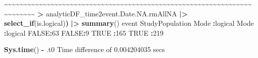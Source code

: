 \documentclass[
]{article}
\newenvironment{Shaded}{\begin{snugshade}}{\end{snugshade}}
\newcommand{\ConstantTok}[1]{\textcolor[rgb]{0.56,0.35,0.01}{#1}}
\newcommand{\DecValTok}[1]{\textcolor[rgb]{0.00,0.00,0.81}{#1}}
\newcommand{\ErrorTok}[1]{\textcolor[rgb]{0.64,0.00,0.00}{\textbf{#1}}}
\newcommand{\FloatTok}[1]{\textcolor[rgb]{0.00,0.00,0.81}{#1}}
\newcommand{\FunctionTok}[1]{\textcolor[rgb]{0.13,0.29,0.53}{\textbf{#1}}}
\newcommand{\NormalTok}[1]{#1}
\newcommand{\SpecialCharTok}[1]{\textcolor[rgb]{0.81,0.36,0.00}{\textbf{#1}}}
\begin{document}
\begin{Shaded}
\begin{Highlighting}[]
    \SpecialCharTok{\textasciitilde{}}\ErrorTok{\textasciitilde{}\textasciitilde{}\textasciitilde{}\textasciitilde{}\textasciitilde{}\textasciitilde{}\textasciitilde{}\textasciitilde{}\textasciitilde{}\textasciitilde{}\textasciitilde{}\textasciitilde{}\textasciitilde{}\textasciitilde{}\textasciitilde{}\textasciitilde{}\textasciitilde{}\textasciitilde{}\textasciitilde{}\textasciitilde{}\textasciitilde{}\textasciitilde{}\textasciitilde{}\textasciitilde{}\textasciitilde{}\textasciitilde{}\textasciitilde{}\textasciitilde{}\textasciitilde{}\textasciitilde{}\textasciitilde{}\textasciitilde{}\textasciitilde{}\textasciitilde{}\textasciitilde{}\textasciitilde{}\textasciitilde{}\textasciitilde{}\textasciitilde{}\textasciitilde{}\textasciitilde{}\textasciitilde{}\textasciitilde{}\textasciitilde{}\textasciitilde{}\textasciitilde{}\textasciitilde{}\textasciitilde{}\textasciitilde{}\textasciitilde{}\textasciitilde{}\textasciitilde{}\textasciitilde{}\textasciitilde{}\textasciitilde{}\textasciitilde{}\textasciitilde{}\textasciitilde{}\textasciitilde{}\textasciitilde{}\textasciitilde{}\textasciitilde{}\textasciitilde{}\textasciitilde{}\textasciitilde{}\textasciitilde{}\textasciitilde{}\textasciitilde{}\textasciitilde{}\textasciitilde{}\textasciitilde{}}    
 \ErrorTok{\textgreater{}}\NormalTok{ analyticDF\_time2event.Date.NA.rmAllNA }\SpecialCharTok{|\textgreater{}} \FunctionTok{select\_if}\NormalTok{(is.logical)}\ErrorTok{)} \SpecialCharTok{|\textgreater{}} \FunctionTok{summary}\NormalTok{()  }
\NormalTok{   event         StudyPopulation}
\NormalTok{ Mode }\SpecialCharTok{:}\NormalTok{logical   Mode }\SpecialCharTok{:}\NormalTok{logical  }
 \ConstantTok{FALSE}\SpecialCharTok{:}\DecValTok{63}        \ConstantTok{FALSE}\SpecialCharTok{:}\DecValTok{9}        
 \ConstantTok{TRUE} \SpecialCharTok{:}\DecValTok{165}       \ConstantTok{TRUE} \SpecialCharTok{:}\DecValTok{219}      
\end{Highlighting}
\end{Shaded}

\begin{Shaded}
\begin{Highlighting}[]
\FunctionTok{Sys.time}\NormalTok{() }\SpecialCharTok{{-}}\NormalTok{ .t0}
\NormalTok{Time difference of }\FloatTok{0.004204035}\NormalTok{ secs}
\end{Highlighting}
\end{Shaded}
\end{document}
